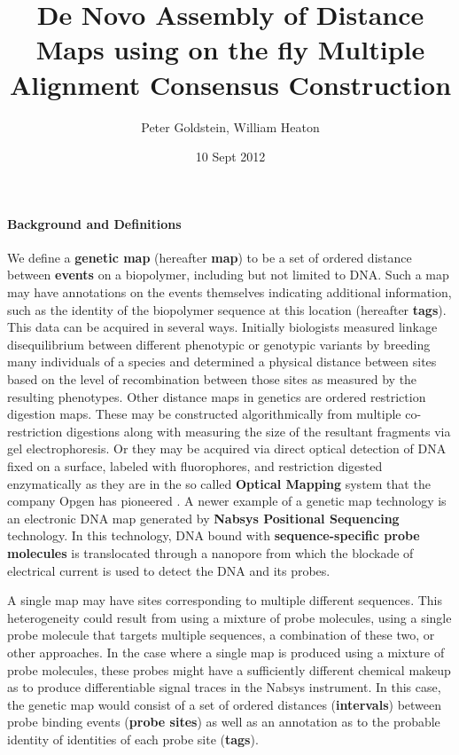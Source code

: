 \documentclass[11pt]{article}
\title{De Novo Assembly of Distance Maps using on the fly Multiple Alignment Consensus Construction}
\date{10 Sept 2012} %
\author{Peter Goldstein, William Heaton}
\begin{document}
\maketitle

\paragraph{Background and Definitions\newline}
\par{
We define a \textbf{genetic map} (hereafter \textbf{map}) to be a set of ordered distance between \textbf{events} on a biopolymer, including but not limited to DNA. Such a map may have annotations on the events themselves indicating additional information, such as the identity of the biopolymer sequence at this location (hereafter \textbf{tags}). This data can be acquired in several ways.  Initially biologists measured linkage disequilibrium between different phenotypic or genotypic variants by breeding many individuals of a species and determined a physical distance between sites based on the level of recombination between those sites as measured by the resulting phenotypes.  Other distance maps in genetics are ordered restriction digestion maps.  These may be constructed algorithmically from multiple co-restriction digestions along with measuring the size of the resultant fragments via gel electrophoresis. Or they may be acquired via direct optical detection of DNA fixed on a surface, labeled with fluorophores, and restriction digested enzymatically as they are in the so called \textbf{Optical Mapping} system that the company Opgen has pioneered \cite{Opgen0}\cite{Opgen2}\cite{Opgen3}. A newer example of a genetic map technology is  an electronic DNA map generated by \textbf{Nabsys Positional Sequencing} technology.  In this technology, DNA bound with \textbf{sequence-specific probe molecules} is translocated through a nanopore from which the blockade of electrical current is used to detect the DNA and its probes.  

}
\par{
A single map may have sites corresponding to multiple different sequences.  This heterogeneity could result from using a mixture of probe molecules, using a single probe molecule that targets multiple sequences, a combination of these two, or other approaches.  In the case where a single map is produced using a mixture of probe molecules, these probes might have a sufficiently different chemical makeup as to produce differentiable signal traces in the Nabsys instrument.  In this case, the genetic map would consist of a set of ordered distances (\textbf{intervals}) between probe binding events (\textbf{probe sites}) as well as an annotation as to the probable identity of identities of each probe site (\textbf{tags}).
 }
 
\end{document}
